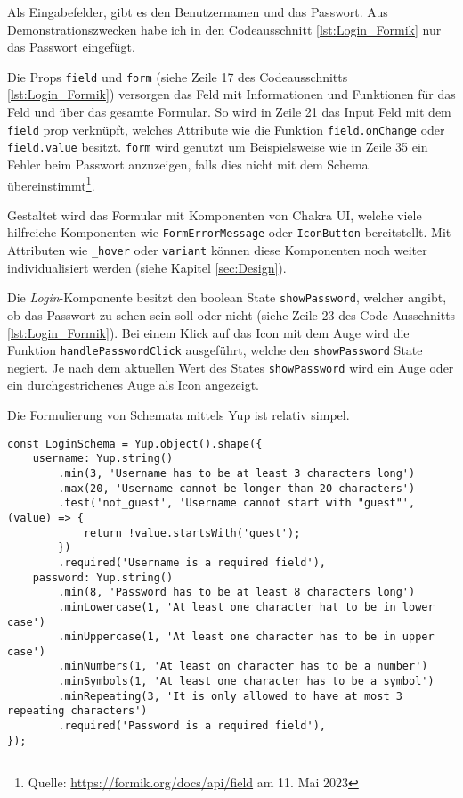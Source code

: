 Als Eingabefelder, gibt es  den Benutzernamen und das Passwort. Aus Demonstrationszwecken habe ich in den Codeausschnitt \ref{lst:Login_Formik} nur das Passwort eingefügt.

Die Props \verb|field| und \verb|form| (siehe Zeile 17 des Codeausschnitts \ref{lst:Login_Formik}) versorgen das Feld mit Informationen und Funktionen für das Feld und über das gesamte Formular. So wird in Zeile 21 das Input Feld mit dem \verb|field| prop verknüpft, welches Attribute wie die Funktion \verb|field.onChange| oder \verb|field.value| besitzt. \verb|form| wird genutzt um Beispielsweise wie in Zeile 35 ein Fehler beim Passwort anzuzeigen, falls dies nicht mit dem Schema übereinstimmt\footnote{Quelle: \url{https://formik.org/docs/api/field} am 11. Mai 2023}.

Gestaltet wird das Formular mit Komponenten von Chakra UI, welche viele hilfreiche Komponenten wie \verb|FormErrorMessage| oder \verb|IconButton| bereitstellt. Mit Attributen wie \verb|_hover| oder \verb|variant| können diese Komponenten noch weiter individualisiert werden (siehe Kapitel \ref{sec:Design}).

Die \textit{Login}-Komponente besitzt den boolean State \verb|showPassword|, welcher angibt, ob das Passwort zu sehen sein soll oder nicht (siehe Zeile 23 des Code Ausschnitts \ref{lst:Login_Formik}). Bei einem Klick auf das Icon mit dem Auge wird die Funktion \verb|handlePasswordClick| ausgeführt, welche den \verb|showPassword| State negiert. Je nach dem aktuellen Wert des States \verb|showPassword| wird ein Auge oder ein durchgestrichenes Auge als Icon angezeigt.

Die Formulierung von Schemata mittels Yup ist relativ simpel.

\begin{lstlisting}[style=codeStyle, caption={Yup Schma für das Anmelden}, label={lst:Yup-Login}]
const LoginSchema = Yup.object().shape({
    username: Yup.string()
        .min(3, 'Username has to be at least 3 characters long')
        .max(20, 'Username cannot be longer than 20 characters')
        .test('not_guest', 'Username cannot start with "guest"', (value) => {
            return !value.startsWith('guest');
        })
        .required('Username is a required field'),
    password: Yup.string()
        .min(8, 'Password has to be at least 8 characters long')
        .minLowercase(1, 'At least one character hat to be in lower case')
        .minUppercase(1, 'At least one character has to be in upper case')
        .minNumbers(1, 'At least on character has to be a number')
        .minSymbols(1, 'At least one character has to be a symbol')
        .minRepeating(3, 'It is only allowed to have at most 3 repeating characters')
        .required('Password is a required field'),
});
\end{lstlisting}

